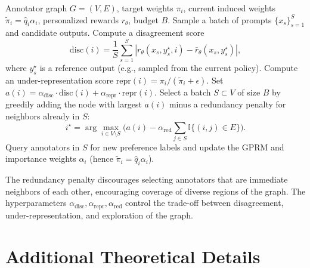 \documentclass{article}
\theoremstyle{plain}
\theoremstyle{definition}
\theoremstyle{remark}
\begin{document}
\begin{algorithm}[h]
    \caption{Graph-Active Feedback Selection}
    \label{alg:graph-active}
    \begin{algorithmic}[1]
        \REQUIRE Annotator graph $G=(V,E)$, target weights $\pi_i$, current
        induced weights $\tilde\pi_i = \hat q_i \alpha_i$, personalized
        rewards $r_\theta$, budget $B$.
        \STATE Sample a batch of prompts $\{x_s\}_{s=1}^S$ and candidate
        outputs.
            \STATE Compute a disagreement score
            \[
                \text{disc}(i)
                =
                \frac{1}{S}
                \sum_{s=1}^S
                \left|
                    r_\theta(x_s, y_s^\star, i)
                    -
                    \bar r_\theta(x_s, y_s^\star)
                \right|,
            \]
            where $y_s^\star$ is a reference output (e.g., sampled from the
            current policy).
            \STATE Compute an under-representation score
            $\text{repr}(i) = \pi_i / (\tilde\pi_i + \epsilon)$.
            \STATE Set
            $a(i) =
            \alpha_{\mathrm{disc}} \cdot \text{disc}(i)
            +
            \alpha_{\mathrm{repr}} \cdot \text{repr}(i)$.
        \ENDFOR
        \STATE Select a batch $S \subset V$ of size $B$ by greedily adding
        the node with largest $a(i)$ minus a redundancy penalty for neighbors
        already in $S$:
        \[
            i^\star
            =
            \arg\max_{i \in V \setminus S}
            \Big(
                a(i)
                -
                \alpha_{\mathrm{red}} \sum_{j \in S} \mathbb{I}\{(i,j) \in E\}
            \Big).
        \]
        \STATE Query annotators in $S$ for new preference labels and update
        the GPRM and importance weights $\alpha_i$ (hence
        $\tilde\pi_i = \hat q_i \alpha_i$).
    \end{algorithmic}
\end{algorithm}

The redundancy penalty discourages selecting annotators that are immediate
neighbors of each other, encouraging coverage of diverse regions of the
graph. The hyperparameters
$\alpha_{\mathrm{disc}}, \alpha_{\mathrm{repr}}, \alpha_{\mathrm{red}}$
control the trade-off between disagreement, under-representation, and
exploration of the graph.


\section{Additional Theoretical Details}
\label{app:theory-details}
\end{document}
